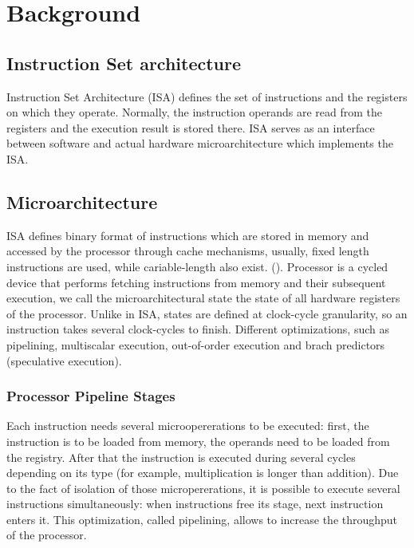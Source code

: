 \chapter{Background}

\section{Instruction Set architecture}

Instruction Set Architecture (ISA) defines the set of instructions and the registers on which they operate. Normally, the instruction operands are read from the registers and the execution result is stored there. ISA serves as an interface between software and actual hardware microarchitecture which implements the ISA. 


\section{Microarchitecture}

ISA defines binary format of instructions which are stored in memory and accessed by the processor through cache mechanisms, usually, fixed length instructions are used, while cariable-length also exist. (). Processor is a cycled device that performs fetching instructions from memory and their subsequent execution, we call the microarchitectural state the state of all hardware registers of the processor. Unlike in ISA, states are defined at clock-cycle granularity, so an instruction takes several clock-cycles to finish. Different optimizations, such as pipelining, multiscalar execution, out-of-order execution and brach predictors (speculative execution).

\subsection{Processor Pipeline Stages}

Each instruction needs several microopererations to be executed: first, the instruction is to be loaded from memory, the operands need to be loaded from the registry. After that the instruction is executed during several cycles depending on its type (for example, multiplication is longer than addition). Due to the fact of isolation of those micropererations, it is possible to execute several instructions simultaneously: when instructions free its stage, next instruction enters it. This optimization, called pipelining, allows to increase the throughput of the processor.

